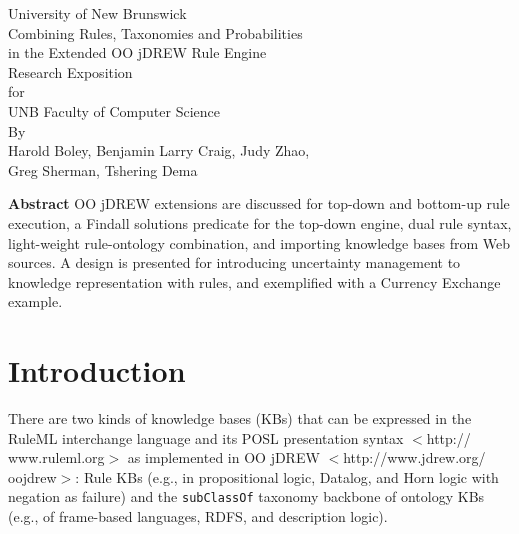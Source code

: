 \documentclass [letterpaper] {Article}
\begin{document}
\begin{small}
\doublespacing
\large

\begin{titlepage}
\begin{center}
\vspace{10mm}
\Large University of New Brunswick\\
\vspace{10mm}
\Large{Combining Rules, Taxonomies and Probabilities}\\
\Large{in the Extended OO jDREW Rule Engine}\\
\vspace{5mm}
\Large {Research Exposition}
\\
\hspace{5.5mm}for
\\
\Large {UNB Faculty of Computer Science}\\
\vspace{10mm}
By\\
\vspace{5mm}Harold Boley, Benjamin Larry Craig, Judy Zhao,\\
\hspace{7mm}Greg Sherman, Tshering Dema\\
\vspace{10mm}
\end{center}
{\bf Abstract}
OO jDREW extensions are discussed for top-down and bottom-up rule
execution, a Findall solutions predicate for the top-down engine, dual
rule syntax, light-weight rule-ontology combination, and importing
knowledge bases from Web sources. A design is presented for introducing
uncertainty management to knowledge representation with rules, and
exemplified with a Currency Exchange example.

\end{titlepage}
\newpage
\thispagestyle{empty}
\Large

\newpage
\singlespacing

\section{Introduction}

\hspace{0.3in}There are two kinds of knowledge bases (KBs) that can be expressed in the RuleML interchange language and its POSL presentation syntax $<$http:// \linebreak
www.ruleml.org$>$ as implemented in OO jDREW $<$http://www.jdrew.org/ \linebreak 
oojdrew$>$: Rule KBs (e.g., in propositional logic, Datalog, and Horn logic with negation as failure) and the {\tt subClassOf} taxonomy backbone of ontology KBs (e.g., of frame-based languages, RDFS, and description logic).


\end{small}
\end{document}
